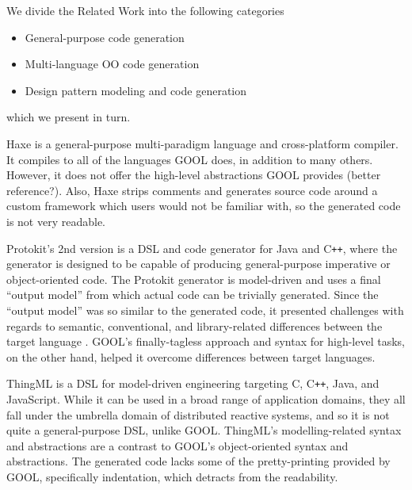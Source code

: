 \documentclass[sigplan,review,anonymous,prologue,dvipsnames]{acmart}
\newcommand{\Cplusplus}{C\texttt{++}}
\begin{document}
We divide the Related Work into the following categories
\begin{itemize}
\item General-purpose code generation
\item Multi-language OO code generation
\item Design pattern modeling and code generation
\end{itemize}
which we present in turn.

Haxe is a general-purpose multi-paradigm language and cross-platform compiler.
It compiles to all of the languages GOOL does, in addition to many others.
However, it does not offer the high-level abstractions GOOL provides
\cite{Haxe} (better reference?). Also, Haxe strips comments and generates
source code around a custom framework which users would not be familiar with,
so the generated code is not very readable.

Protokit's 2nd version is a DSL and code generator for Java and \Cplusplus, where the
generator is designed to be capable of producing general-purpose imperative or
object-oriented code. The Protokit generator is model-driven and uses a final
``output model'' from which actual code can be trivially generated. Since the
``output model'' was so similar to the generated code, it presented challenges
with regards to semantic, conventional, and library-related differences between
the target language \cite{kovesdan2017multi}. GOOL's finally-tagless approach
and syntax for high-level tasks, on the other hand, helped it overcome
differences between target languages.

ThingML \cite{harrand2016thingml} is a DSL for model-driven engineering
targeting C, \Cplusplus, Java, and JavaScript. While it can be used in a broad range
of application domains, they all fall under the umbrella domain of distributed
reactive systems, and so it is not quite a general-purpose DSL, unlike GOOL.
ThingML's modelling-related syntax and abstractions are a contrast to GOOL's
object-oriented syntax and abstractions. The generated code lacks some of the
pretty-printing provided by GOOL, specifically indentation, which detracts from
the readability.
\end{document}
